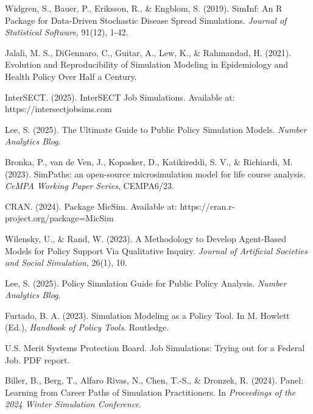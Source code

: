 \documentclass[main.tex]{subfiles}
\begin{document}
\begin{thebibliography}{99}
Widgren, S., Bauer, P., Eriksson, R., \& Engblom, S. (2019). SimInf: An R Package for Data-Driven Stochastic Disease Spread Simulations. \textit{Journal of Statistical Software}, 91(12), 1-42.

Jalali, M. S., DiGennaro, C., Guitar, A., Lew, K., \& Rahmandad, H. (2021). Evolution and Reproducibility of Simulation Modeling in Epidemiology and Health Policy Over Half a Century.

InterSECT. (2025). InterSECT Job Simulations. Available at: https://intersectjobsims.com

Lee, S. (2025). The Ultimate Guide to Public Policy Simulation Models. \textit{Number Analytics Blog}.

Bronka, P., van de Ven, J., Kopasker, D., Katikireddi, S. V., \& Richiardi, M. (2023). SimPaths: an open-source microsimulation model for life course analysis. \textit{CeMPA Working Paper Series}, CEMPA6/23.

CRAN. (2024). Package MicSim. Available at: https://cran.r-project.org/package=MicSim

Wilensky, U., \& Rand, W. (2023). A Methodology to Develop Agent-Based Models for Policy Support Via Qualitative Inquiry. \textit{Journal of Artificial Societies and Social Simulation}, 26(1), 10.

Lee, S. (2025). Policy Simulation Guide for Public Policy Analysis. \textit{Number Analytics Blog}.

Furtado, B. A. (2023). Simulation Modeling as a Policy Tool. In M. Howlett (Ed.), \textit{Handbook of Policy Tools}. Routledge.

U.S. Merit Systems Protection Board. Job Simulations: Trying out for a Federal Job. PDF report.

Biller, B., Berg, T., Alfaro Rivas, N., Chen, T.-S., \& Dronzek, R. (2024). Panel: Learning from Career Paths of Simulation Practitioners. In \textit{Proceedings of the 2024 Winter Simulation Conference}.

\end{thebibliography}
\end{document}
